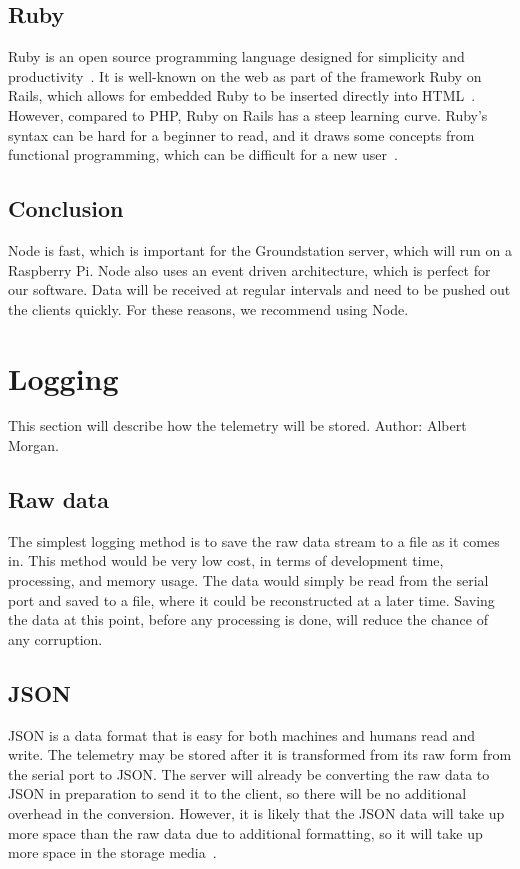 \documentclass[10pt,draftclsnofoot,onecolumn]{IEEEtran}
\begin{document}
	\subsection{Ruby}
	Ruby is an open source programming language designed for simplicity and productivity~\cite{ruby}.
	It is well-known on the web as part of the framework Ruby on Rails, which allows for embedded Ruby to be inserted directly into HTML~\cite{getting-started-with-rails}.
	However, compared to PHP, Ruby on Rails has a steep learning curve.
	Ruby's syntax can be hard for a beginner to read, and it draws some concepts from functional programming, which can be difficult for a new user~\cite{ruby-on-rails-vs-php-the-good-the-bad}.	

	\subsection{Conclusion}
	Node is fast, which is important for the Groundstation server, which will run on a Raspberry Pi.
	Node also uses an event driven architecture, which is perfect for our software. Data will be received at regular intervals and need to be pushed out the clients quickly. For these reasons, we recommend using Node.


	\section{Logging}
	This section will describe how the telemetry will be stored. Author: Albert Morgan.
	\subsection{Raw data}
	The simplest logging method is to save the raw data stream to a file as it comes in.
	This method would be very low cost, in terms of development time, processing, and memory usage.
	The data would simply be read from the serial port and saved to a file, where it could be reconstructed at a later time.
	Saving the data at this point, before any processing is done, will reduce the chance of any corruption.
	
	\subsection{JSON}
	\ac{JSON} is a data format that is easy for both machines and humans read and write.
	The telemetry may be stored after it is transformed from its raw form from the serial port to \ac{JSON}.
	The server will already be converting the raw data to \ac{JSON} in preparation to send it to the client, so there will be no additional overhead in the conversion.
	However, it is likely that the \ac{JSON} data will take up more space than the raw data due to additional formatting, so it will take up more space in the storage media~\cite{json}.
	
\end{document}
